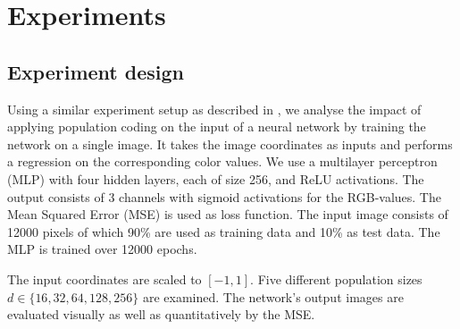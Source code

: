 \section{Experiments}
\subsection{Experiment design}
Using a similar experiment setup as described in \cite{tancik2020fourier}, we analyse the impact of applying population coding on the input of a neural network by training the network on a single image. 
It takes the image coordinates as inputs and performs a regression on the corresponding color values. 
We use a multilayer perceptron (MLP) with four hidden layers, each of size 256, and ReLU activations. 
The output consists of 3 channels with sigmoid activations for the RGB-values. 
The Mean Squared Error (MSE) is used as loss function. 
The input image consists of 12000 pixels of which 90\% are used as training data and 10\% as test data. 
The MLP is trained over 12000 epochs.

The input coordinates are scaled to $[-1,1]$. Five different population sizes $d \in \{16, 32, 64, 128, 256\}$ are examined. The network's output images are evaluated visually as well as quantitatively by the MSE.

